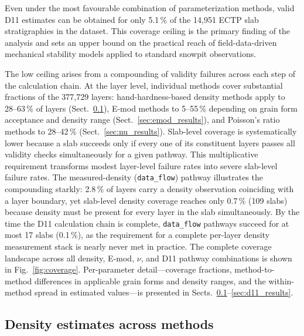 \documentclass[hess, manuscript]{copernicus}
\begin{document}
Even under the most favourable combination of parameterization methods, valid D11 estimates can be obtained for only 5.1\,\% of the 14{,}951 ECTP slab stratigraphies in the dataset. This coverage ceiling is the primary finding of the analysis and sets an upper bound on the practical reach of field-data-driven mechanical stability models applied to standard snowpit observations.

The low ceiling arises from a compounding of validity failures across each step of the calculation chain. At the layer level, individual methods cover substantial fractions of the 377{,}729 layers: hand-hardness-based density methods apply to 28--63\,\% of layers (Sect.~\ref{sec:density_results}), E-mod methods to 5--55\,\% depending on grain form acceptance and density range (Sect.~\ref{sec:emod_results}), and Poisson's ratio methods to 28--42\,\% (Sect.~\ref{sec:nu_results}). Slab-level coverage is systematically lower because a slab succeeds only if every one of its constituent layers passes all validity checks simultaneously for a given pathway. This multiplicative requirement transforms modest layer-level failure rates into severe slab-level failure rates. The measured-density (\texttt{data\_flow}) pathway illustrates the compounding starkly: 2.8\,\% of layers carry a density observation coinciding with a layer boundary, yet slab-level density coverage reaches only 0.7\,\% (109 slabs) because density must be present for every layer in the slab simultaneously. By the time the D11 calculation chain is complete, \texttt{data\_flow} pathways succeed for at most 17 slabs (0.1\,\%), as the requirement for a complete per-layer density measurement stack is nearly never met in practice. The complete coverage landscape across all density, E-mod, $\nu$, and D11 pathway combinations is shown in Fig.~\ref{fig:coverage}. Per-parameter detail—coverage fractions, method-to-method differences in applicable grain forms and density ranges, and the within-method spread in estimated values—is presented in Sects.~\ref{sec:density_results}--\ref{sec:d11_results}.

\FloatBarrier

\subsection{Density estimates across methods}
\label{sec:density_results}

\end{document}
